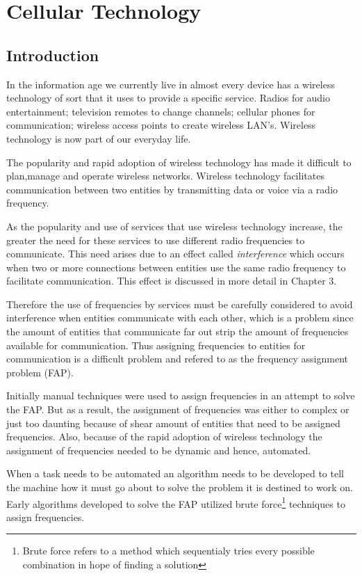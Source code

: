 \chapter{Cellular Technology}
\label{chpt:celltech}
\section{Introduction}
In the information age we currently live in almost every device has a wireless technology of sort that it uses to provide a specific service. Radios for audio entertainment; television remotes to change 
channels; cellular phones for communication; wireless access points to create wireless LAN's\cite{Karen2004}. Wireless technology is now part of our everyday life.

The popularity and rapid adoption of wireless technology has made it difficult to plan,manage and operate wireless networks. Wireless technology facilitates communication between two entities by transmitting data or voice via a radio frequency. 

As the popularity and use of services that use wireless technology increase, the greater the need for these services to use different radio frequencies to communicate. This need arises due to an effect called \emph{interference} which occurs when two or more connections between entities use the same radio frequency to facilitate communication. This effect is discussed in more detail in Chapter 3.

Therefore the use of frequencies by services must be carefully considered to avoid interference when entities communicate with each other, which is a problem since the amount of entities that communicate far out strip the amount of frequencies available for communication. Thus assigning frequencies to entities for communication is a difficult problem and refered to as the frequency assignment problem (FAP).

Initially manual techniques were used to assign frequencies in an attempt to solve the FAP. But as a result, the assignment of frequencies was either to complex or just too daunting because of shear amount of entities that need to be assigned frequencies. Also, because of the rapid adoption of wireless technology the assignment of frequencies needed to be dynamic and hence, automated.

When a task needs to be automated an algorithm needs to be developed to tell the machine how it must go about to solve the problem it is destined to work on. Early algorithms developed to solve the FAP utilized brute force\footnote{Brute force refers to a method which sequentialy tries every possible combination in hope of finding a solution} techniques to assign frequencies.

